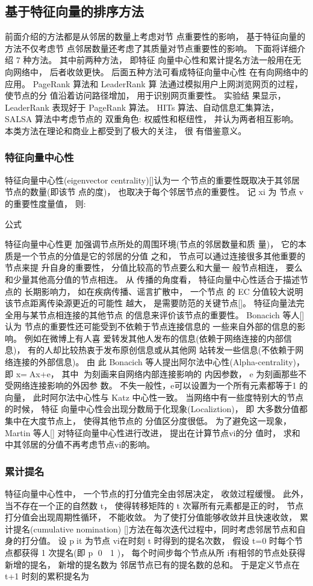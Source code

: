 	\subsection{基于特征向量的排序方法}
	前面介绍的方法都是从邻居的数量上考虑对节 点重要性的影响， 基于特征向量的方法不仅考虑节 点邻居数量还考虑了其质量对节点重要性的影响。 下面将详细介绍 7 种方法。 其中前两种方法， 即特征 向量中心性和累计提名方法一般用在无向网络中， 后者收敛更快。 后面五种方法可看成特征向量中心性 在有向网络中的应用。 PageRank 算法和 LeaderRank 算 法通过模拟用户上网浏览网页的过程， 使节点的分 值沿着访问路径增加， 用于识别网页重要性。 实验结 果显示， LeaderRank 表现好于 PageRank 算法。 HITs 算法、自动信息汇集算法， SALSA 算法中考虑节点的 双重角色: 权威性和枢纽性， 并认为两者相互影响。 本类方法在理论和商业上都受到了极大的关注， 很 有借鉴意义。
	\subsubsection{特征向量中心性}
	特征向量中心性(eigenvector centrality)[]认为一 个节点的重要性既取决于其邻居节点的数量(即该节 点的度)， 也取决于每个邻居节点的重要性。 记 xi 为 节点 v 的重要性度量值， 则:

				公式

				特征向量中心性更 加强调节点所处的周围环境(节点的邻居数量和质 量)， 它的本质是一个节点的分值是它的邻居的分值 之和， 节点可以通过连接很多其他重要的节点来提 升自身的重要性， 分值比较高的节点要么和大量一 般节点相连， 要么和少量其他高分值的节点相连。 从 传播的角度看， 特征向量中心性适合于描述节点的 长期影响力， 如在疾病传播、谣言扩散中， 一个节点 的 EC 分值较大说明该节点距离传染源更近的可能性 越大， 是需要防范的关键节点[]。
				特征向量法完全用与某节点相连接的其他节点 的信息来评价该节点的重要性。 Bonacich 等人[]认为 节点的重要性还可能受到不依赖于节点连接信息的 一些来自外部的信息的影响。 例如在微博上有人喜 爱转发其他人发布的信息(依赖于网络连接的内部信 息)， 有的人却比较热衷于发布原创信息或从其他网 站转发一些信息(不依赖于网络连接的外部信息)。 由 此 Bonacich 等人提出阿尔法中心性(Alpha-centrality)， 即 x=Ax+e， 其中 为刻画来自网络内部连接影响的 内因参数， e 为刻画那些不受网络连接影响的外因参 数。 不失一般性，e可以设置为一个所有元素都等于1 的向量， 此时阿尔法中心性与 Katz 中心性一致。
				当网络中有一些度特别大的节点的时候， 特征 向量中心性会出现分数局于化现象(Localiztion)， 即 大多数分值都集中在大度节点上， 使得其他节点的 分值区分度很低。 为了避免这一现象， Martin 等人[] 对特征向量中心性进行改进， 提出在计算节点vi的分 值时， 求和中其邻居的分值不再考虑节点vi的影响。
	\subsubsection{累计提名}
	特征向量中心性中， 一个节点的打分值完全由邻居决定， 收敛过程缓慢。 此外， 当不存在一个正的自然数 t， 使得转移矩阵的 t 次幂所有元素都是正的时， 节点打分值会出现周期性循环， 不能收敛。 为了使打分值能够收敛并且快速收敛， 累计提名(cumulative nomination) []方法在每次迭代过程中，同时考虑邻居节点和自身的打分值。 设 pit 为节点 vi在时刻 t 时得到的提名次数， 假设 t=0 时每个节点都获得 1 次提名(即 p 0  1 )， 每个时间步每个节点从所 i有相邻的节点处获得新增的提名， 新增的提名数为 邻居节点已有的提名数的总和。 于是定义节点在 t+1 时刻的累积提名为

